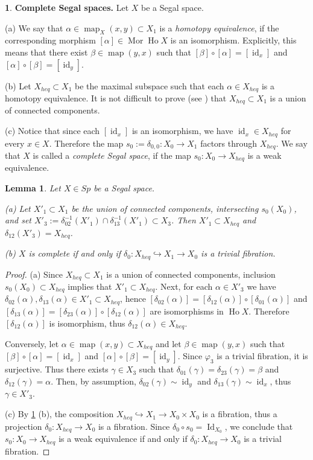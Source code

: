 \documentclass[12pt]{amsart}
\theoremstyle{plain}
\newtheorem{Lem}[Thm]{Lemma}
\theoremstyle{definition}
\newtheorem{Emp}[Thm]{}
\numberwithin{equation}{section}
\newcommand{\hra}{\hookrightarrow}
\newcommand{\gm}{\gamma}
\newcommand{\dt}{\delta}
\newcommand{\al}{\alpha}
\newcommand{\re}[1]{\ref{E:#1}}
\newcommand{\id}{\operatorname{id}}
\newcommand{\Mor}{\operatorname{Mor}}
\newcommand{\map}{\operatorname{map}}
\newcommand{\Ho}{\operatorname{Ho}}
\newcommand{\Id}{\operatorname{Id}}
\begin{document}
\begin{Emp} \label{E:css}
{\bf Complete Segal spaces.} Let $X$ be a Segal space.

(a) We say that $\al\in\map_X(x,y)\subset X_1$ is a {\em homotopy
equivalence}, if the corresponding morphism $[\al]\in \Mor \Ho X$
is an isomorphism. Explicitly, this means that there exist
$\beta\in \map(y,x)$ such that $[\beta]\circ[\al]=[\id_x]$ and
$[\al]\circ [\beta]=[\id_y]$.

(b) Let $X_{heq}\subset X_1$ be the maximal subspace such that each
$\al\in X_{heq}$ is a homotopy equivalence. It is not difficult to
prove (see \cite[Lem. 5.8]{Re}) that $X_{heq}\subset X_1$ is a
union of connected components.

(c) Notice that since each $[\id_x]$ is an isomorphism, we have
$\id_x\in X_{heq}$ for every $x\in X$. Therefore the map
$s_0:=\dt_{0,0}:X_0\to X_1$ factors through $X_{heq}$. We say that $X$ is
called a {\em  complete Segal space}, if the map $s_0:X_0\to
X_{heq}$ is a weak equivalence.
\end{Emp}


\begin{Lem} \label{L:css}
Let $X\in Sp$ be a Segal space.

(a) Let $X'_1\subset X_1$ be the union of connected components,
intersecting $s_0(X_0)$, and set
$X'_3:=\dt^{-1}_{02}(X'_1)\cap\dt_{13}^{-1}(X'_1)\subset X_3$.
Then $X'_1\subset X_{heq}$ and $\dt_{12}(X'_3)=X_{heq}$.

(b) $X$ is complete if and only if $\dt_0:X_{heq}\hra X_1\to X_0$
is a trivial fibration.
\end{Lem}

\begin{proof}
(a) Since $X_{heq}\subset X_1$ is a union of connected components,  inclusion
$s_0(X_0)\subset X_{heq}$ implies that $X'_1\subset X_{heq}$. 
Next, for each $\al\in X'_3$ we have
$\dt_{02}(\al),\dt_{13}(\al)\in X'_1\subset X_{heq}$, hence 
$[\dt_{02}(\al)]=[\dt_{12}(\al)]\circ
[\dt_{01}(\al)]$ and $[\dt_{13}(\al)]=[\dt_{23}(\al)]\circ
[\dt_{12}(\al)]$ are isomorphisms in $\Ho X$. Therefore 
$[\dt_{12}(\al)]$ is isomorphism, thus $\dt_{12}(\al)\in X_{heq}$.

Conversely, let $\al\in \map(x,y)\subset X_{heq}$ and let
$\beta\in \map(y,x)$ such that $[\beta]\circ[\al]=[\id_x]$ and
$[\al]\circ [\beta]=[\id_y]$. Since  $\varphi_3$ is a trivial
fibration, it is surjective. Thus there exists $\gm\in X_3$ such that
$\dt_{01}(\gm)=\dt_{23}(\gm)=\beta$ and $\dt_{12}(\gm)=\al$. Then,
by assumption, $\dt_{02}(\gm)\sim\id_y$ and
$\dt_{13}(\gm)\sim\id_x$, thus $\gm\in X'_3$.

(c) By \re{css} (b), the composition $X_{heq}\hra X_1\to X_0\times X_0$ is a
fibration, thus a projection $\dt_0:X_{heq}\to X_0$ is a
fibration. Since $\dt_0\circ s_0=\Id_{X_0}$, we conclude that
$s_0:X_0\to X_{heq}$ is a weak equivalence if and only if
$\dt_0:X_{heq}\to X_0$ is a trivial fibration.
\end{proof}
\end{document}
